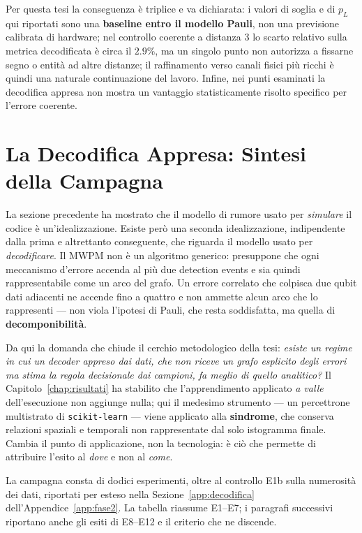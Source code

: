 \begin{onehalfspace}
Per questa tesi la conseguenza è triplice e va dichiarata: i valori di soglia e di $p_L$ qui riportati sono una \textbf{baseline entro il modello Pauli}, non una previsione calibrata di hardware; nel controllo coerente a distanza 3 lo scarto relativo sulla metrica decodificata è circa il $2.9\%$, ma un singolo punto non autorizza a fissarne segno o entità ad altre distanze; il raffinamento verso canali fisici più ricchi è quindi una naturale continuazione del lavoro. Infine, nei punti esaminati la decodifica appresa non mostra un vantaggio statisticamente risolto specifico per l'errore coerente.

\section{La Decodifica Appresa: Sintesi della Campagna}
\label{sec:decodifica_appresa}

La sezione precedente ha mostrato che il modello di rumore usato per \emph{simulare} il codice è un'idealizzazione. Esiste però una seconda idealizzazione, indipendente dalla prima e altrettanto conseguente, che riguarda il modello usato per \emph{decodificare}. Il \ac{MWPM} non è un algoritmo generico: presuppone che ogni meccanismo d'errore accenda al più due detection events e sia quindi rappresentabile come un arco del grafo. Un errore correlato che colpisca due qubit dati adiacenti ne accende fino a quattro e non ammette alcun arco che lo rappresenti --- non viola l'ipotesi di Pauli, che resta soddisfatta, ma quella di \textbf{decomponibilità}.

Da qui la domanda che chiude il cerchio metodologico della tesi: \emph{esiste un regime in cui un decoder appreso dai dati, che non riceve un grafo esplicito degli errori ma stima la regola decisionale dai campioni, fa meglio di quello analitico?} Il Capitolo~\ref{chap:risultati} ha stabilito che l'apprendimento applicato \emph{a valle} dell'esecuzione non aggiunge nulla; qui il medesimo strumento --- un percettrone multistrato di \texttt{scikit-learn} --- viene applicato alla \textbf{sindrome}, che conserva relazioni spaziali e temporali non rappresentate dal solo istogramma finale. Cambia il punto di applicazione, non la tecnologia: è ciò che permette di attribuire l'esito al \emph{dove} e non al \emph{come}.

La campagna consta di dodici esperimenti, oltre al controllo E1b sulla numerosità dei dati, riportati per esteso nella Sezione~\ref{app:decodifica} dell'Appendice~\ref{app:fase2}. La tabella riassume E1--E7; i paragrafi successivi riportano anche gli esiti di E8--E12 e il criterio che ne discende.


\end{onehalfspace}

